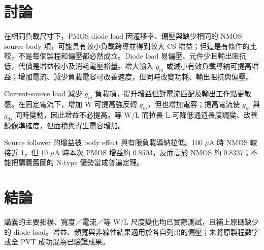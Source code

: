 \section{討論}
在相同負載尺寸下，PMOS diode load 因遷移率、偏壓與缺少相同的 NMOS source-body 項，可能具有較小負載跨導並得到較大 CS 增益；但這是有條件的比較，不是每個製程和偏壓都必然成立。Diode load 易偏壓、元件少且輸出阻抗低，代價是增益較小及消耗電壓裕量。增大輸入 $g_m$ 或減小有效負載導納可提高增益；增加電流、減少負載電容可改善速度，但同時改變功耗、輸出阻抗與偏壓。

Current-source load 減少 $g_m$ 負載項，提升增益但對電流匹配及輸出工作點更敏感。在固定電流下，增加 W 可提高強反轉 $g_m$，但也增加電容；提高電流使 $g_m$ 與 $g_{ds}$ 同時變動，因此增益不必提高。等 W/L 而拉長 L 可降低通道長度調變、改善鏡像準確度，但面積與寄生電容增加。

Source follower 的增益被 body effect 與有限負載導納拉低。100 $\mu$A 時 NMOS 較接近 1，但 10 $\mu$A 時本次 PMOS 增益約 0.8503，反而高於 NMOS 約 0.8337；不能把講義舊圖的 N-type 優勢當成普遍定理。

\section{結論}
講義的主要拓樸、寬度／電流／等 W/L 尺度變化均已實際測試，且補上原碼缺少的 diode load。增益、頻寬與非線性結果適用於各自列出的偏壓；未將原製程數字或全 PVT 成功混為已驗證成果。

